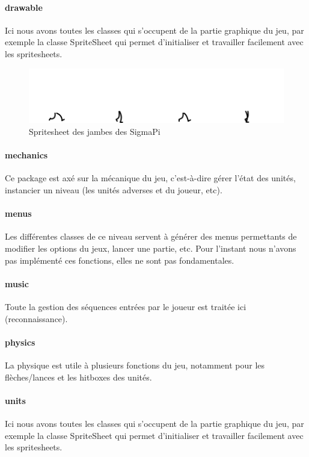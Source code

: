 \documentclass[a4paper,10pt]{article}
\begin{document}
  \paragraph{drawable}
  Ici nous avons toutes les classes qui s'occupent de la partie graphique du jeu, par exemple la classe SpriteSheet qui permet d'initialiser et travailler facilement avec les spritesheets.
 \begin{figure}[!h]
 \centering
 \vspace{-45pt}
 \includegraphics[scale=0.3]{images/legs}
 \caption{Spritesheet des jambes des SigmaPi}
 \end{figure}
  \paragraph{mechanics}
  Ce package est axé sur la mécanique du jeu, c'est-à-dire gérer l'état des unités, instancier un niveau (les unités adverses et du joueur, etc).
  \paragraph{menus}
  Les différentes classes de ce niveau servent à générer des menus permettants de modifier les options du jeux, lancer une partie, etc. Pour l'instant nous n'avons pas implémenté ces fonctions, elles ne sont pas fondamentales.
  \paragraph{music}
  Toute la gestion des séquences entrées par le joueur est traitée ici (reconnaissance).
  \paragraph{physics}
  La physique est utile à plusieurs fonctions du jeu, notamment pour les flèches/lances et les hitboxes des unités.
  \paragraph{units}
  Ici nous avons toutes les classes qui s'occupent de la partie graphique du jeu, par exemple la classe SpriteSheet qui permet d'initialiser et travailler facilement avec les spritesheets.
  
\end{document}
